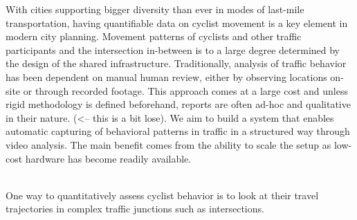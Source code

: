 With cities supporting bigger diversity than ever in modes of last-mile transportation,
having quantifiable data on cyclist movement is a key element in modern city planning. 
Movement patterns of cyclists and other traffic participants and the intersection in-between 
is to a large degree determined by the design of the shared infrastructure. 
Traditionally, analysis of traffic behavior has been dependent on manual human review, either by 
observing locations on-site or through recorded footage. This approach comes at a large cost 
and unless rigid methodology is defined beforehand, reports are often ad-hoc and qualitative in 
their nature. (<-- this is a bit lose). We aim to build a system that enables automatic capturing of behavioral 
patterns in traffic in a structured way through video analysis. The main benefit comes from the ability to 
scale the setup as low-cost hardware has become readily available. 

\ \\
One way to quantitatively assess cyclist behavior is to look at their travel trajectories in 
complex traffic junctions such as intersections. 
